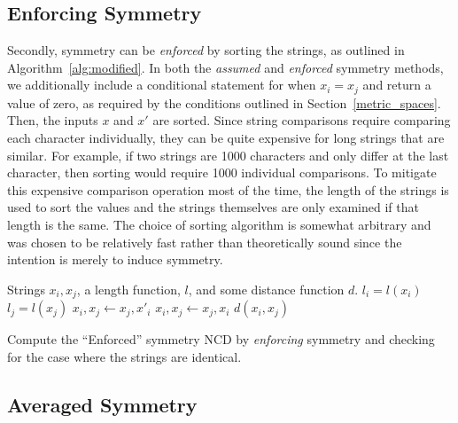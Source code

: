 \documentclass[preprint,12pt]{elsarticle}
\begin{document}
\subsection{Enforcing Symmetry}
Secondly, symmetry can be \textit{enforced} by sorting the strings, as outlined in Algorithm~\ref{alg:modified}.
In both the \textit{assumed} and \textit{enforced} symmetry methods, we additionally include a conditional statement for when $x_i = x_j$ and return a value of zero, as required by the conditions outlined in Section~\ref{metric_spaces}.
Then, the inputs $x$ and $x'$ are sorted.
Since string comparisons require comparing each character individually, they can be quite expensive for long strings that are similar.
For example, if two strings are 1000 characters and only differ at the last character, then sorting would require 1000 individual comparisons.
To mitigate this expensive comparison operation most of the time, the length of the strings is used to sort the values and the strings themselves are only examined if that length is the same.
The choice of sorting algorithm is somewhat arbitrary and was chosen to be relatively fast rather than theoretically sound since the intention is merely to induce symmetry.

\begin{algorithm}
    \begin{algorithmic}
        \Require Strings $x_i, x_j$, a length function, $l$, and some distance function $d$.
         
            \State {}
        \Else  {}
            \State $l_i = l(x_i)$
            \State $l_j = l(x_j)$
                 \State $x_i, x_j \gets x_j, x'_i$ 
                 
                     \State $x_i, x_j \gets x_j, x_i$ 
                \EndIf
            \EndIf
            \State \Return $d(x_i, x_j)$
        \EndIf
    \end{algorithmic}
    \caption{Compute the ``Enforced'' symmetry NCD by \textit{enforcing} symmetry and checking for the case where the strings are identical.}
    \label{alg:modified}
\end{algorithm}

\subsection{Averaged Symmetry}
\end{document}
